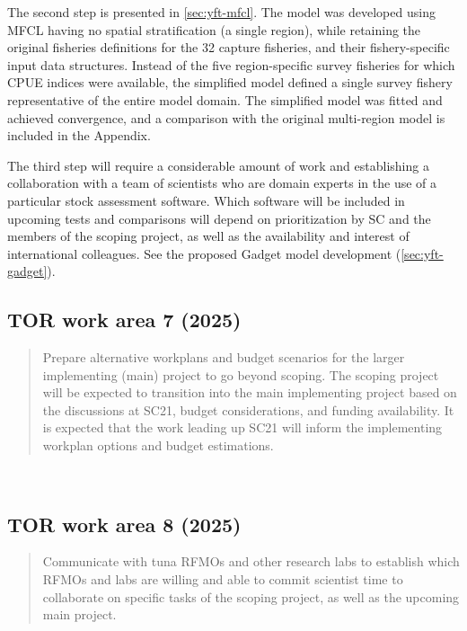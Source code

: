 \documentclass{SCreport}
\begin{document}
The second step is presented in \autoref{sec:yft-mfcl}. The model was developed
using MFCL having no spatial stratification (a single region), while retaining
the original fisheries definitions for the 32 capture fisheries, and their
fishery-specific input data structures. Instead of the five region-specific
survey fisheries for which CPUE indices were available, the simplified model
defined a single survey fishery representative of the entire model domain. The
simplified model was fitted and achieved convergence, and a comparison with the
original multi-region model is included in the Appendix.

The third step will require a considerable amount of work and establishing a
collaboration with a team of scientists who are domain experts in the use of a
particular stock assessment software. Which software will be included in
upcoming tests and comparisons will depend on prioritization by SC and the
members of the scoping project, as well as the availability and interest of
international colleagues. See the proposed Gadget model development
(\autoref{sec:yft-gadget}).

\vspace{2ex}

\subsection{TOR work area 7 (2025)}

\begin{quote}\sf
  Prepare alternative workplans and budget scenarios for the larger implementing
  (main) project to go beyond scoping. The scoping project will be expected to
  transition into the main implementing project based on the discussions at
  SC21, budget considerations, and funding availability. It is expected that the
  work leading up SC21 will inform the implementing workplan options and budget
  estimations.
\end{quote}

\vspace{2ex}

~

\vspace{2ex}

\subsection{TOR work area 8 (2025)}

\begin{quote}\sf
  Communicate with tuna RFMOs and other research labs to establish which RFMOs
  and labs are willing and able to commit scientist time to collaborate on
  specific tasks of the scoping project, as well as the upcoming main project.
\end{quote}
\end{document}
